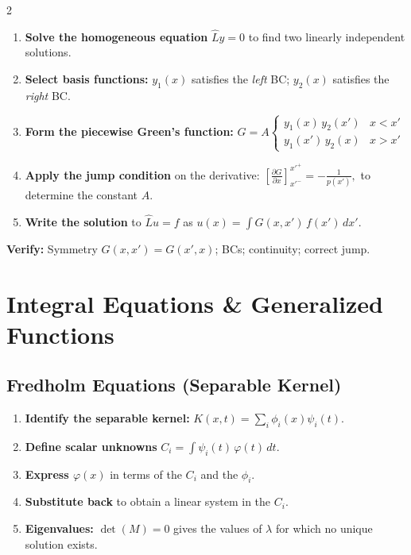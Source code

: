 \documentclass[a4paper,9pt]{article}
\begin{document}
\begin{multicols}{2}
\begin{enumerate}
\item \textbf{Solve the homogeneous equation} $\hat{L}y=0$ to find two linearly independent solutions.
\item \textbf{Select basis functions:} $y_1(x)$ satisfies the \emph{left} BC; $y_2(x)$ satisfies the \emph{right} BC.
\item \textbf{Form the piecewise Green's function:}
$G = A\begin{cases} y_1(x)\,y_2(x') & x<x' \\ y_1(x')\,y_2(x) & x>x' \end{cases}$
\item \textbf{Apply the jump condition} on the derivative:
$\left[\frac{\partial G}{\partial x}\right]_{x'^-}^{x'^+} = -\frac{1}{p(x')},$
to determine the constant $A$.
\item \textbf{Write the solution} to $\hat{L}u=f$ as $u(x)=\int G(x,x')\,f(x')\,dx'$.
\end{enumerate}

\textbf{Verify:} Symmetry $G(x,x')=G(x',x)$; BCs; continuity; correct jump.

\section{Integral Equations \& Generalized Functions}

\subsection{Fredholm Equations (Separable Kernel)}
\begin{enumerate}
\item \textbf{Identify the separable kernel:} $K(x,t)=\sum_i \phi_i(x)\psi_i(t)$.
\item \textbf{Define scalar unknowns} $C_i = \int \psi_i(t)\,\varphi(t)\,dt$.
\item \textbf{Express $\varphi(x)$} in terms of the $C_i$ and the $\phi_i$.
\item \textbf{Substitute back} to obtain a linear system in the $C_i$.
\item \textbf{Eigenvalues:} $\det(M)=0$ gives the values of $\lambda$ for which no unique solution exists.
\end{enumerate}


\end{multicols}
\end{document}

